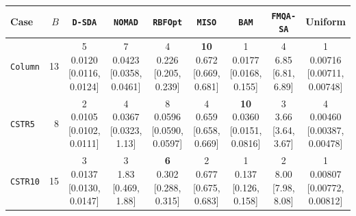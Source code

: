 \begin{tabular}{@{}lrccccccc@{}}\toprule
Case & \(B\) & \texttt{D-SDA} & \texttt{NOMAD} & \texttt{RBFOpt} & \texttt{MISO} & \texttt{BAM} & \texttt{FMQA-SA} & Uniform \\
\midrule
\texttt{Column} & 13 & \makecell{5\\0.0120\\{[0.0116, 0.0124]}} & \makecell{7\\0.0423\\{[0.0358, 0.0461]}} & \makecell{4\\0.226\\{[0.205, 0.239]}} & \makecell{\textbf{10}\\0.672\\{[0.669, 0.681]}} & \makecell{1\\0.0177\\{[0.0168, 0.155]}} & \makecell{4\\6.85\\{[6.81, 6.89]}} & \makecell{1\\0.00716\\{[0.00711, 0.00748]}} \\
\texttt{CSTR5} & 8 & \makecell{2\\0.0105\\{[0.0102, 0.0111]}} & \makecell{4\\0.0367\\{[0.0323, 1.13]}} & \makecell{8\\0.0596\\{[0.0590, 0.0597]}} & \makecell{4\\0.659\\{[0.658, 0.669]}} & \makecell{\textbf{10}\\0.0360\\{[0.0151, 0.0816]}} & \makecell{3\\3.66\\{[3.64, 3.67]}} & \makecell{4\\0.00460\\{[0.00387, 0.00478]}} \\
\texttt{CSTR10} & 15 & \makecell{3\\0.0137\\{[0.0130, 0.0147]}} & \makecell{3\\1.83\\{[0.469, 1.88]}} & \makecell{\textbf{6}\\0.302\\{[0.288, 0.315]}} & \makecell{2\\0.677\\{[0.675, 0.683]}} & \makecell{1\\0.137\\{[0.126, 0.158]}} & \makecell{2\\8.00\\{[7.98, 8.08]}} & \makecell{1\\0.00807\\{[0.00772, 0.00812]}} \\

\end{tabular}
